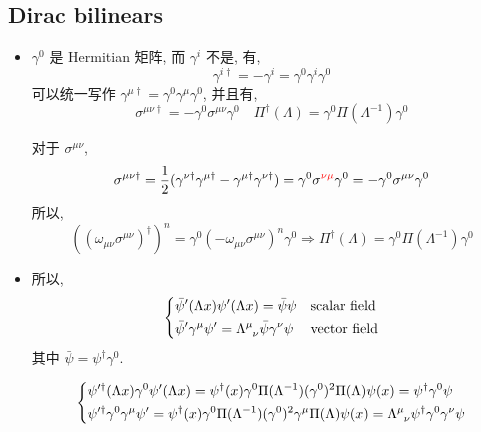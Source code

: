 \subsection{Dirac bilinears}
\begin{itemize}
	\item $\gamma^0$ 是 Hermitian 矩阵, 而 $\gamma^i$ 不是, 有,
	\begin{equation}
		\gamma^{i \dag} = - \gamma^i = \gamma^0 \gamma^i \gamma^0
	\end{equation}
	可以统一写作 $\gamma^{\mu \dag} = \gamma^0 \gamma^\mu \gamma^0$, 并且有,
	\begin{equation}
		\sigma^{\mu \nu \dag} = - \gamma^0 \sigma^{\mu \nu} \gamma^0 \quad \Pi^\dag(\Lambda) = \gamma^0 \Pi(\Lambda^{- 1}) \gamma^0
	\end{equation}
	
	\begin{tcolorbox}[title=calculation:]
		对于 $\sigma^{\mu \nu}$,
		\begin{equation}
			\sigma^{\mu \nu \dag} = \frac{1}{2} (\gamma^{\nu \dag} \gamma^{\mu \dag} - \gamma^{\mu \dag} \gamma^{\nu \dag}) = \gamma^0 \sigma^{\mathcolor{red}{\nu \mu}} \gamma^0 = - \gamma^0 \sigma^{\mu \nu} \gamma^0
		\end{equation}
		所以,
		\begin{equation}
			((\omega_{\mu \nu} \sigma^{\mu \nu})^\dag)^n = \gamma^0 (- \omega_{\mu \nu} \sigma^{\mu \nu})^n \gamma^0 \Longrightarrow \Pi^\dag(\Lambda) = \gamma^0 \Pi(\Lambda^{- 1}) \gamma^0
		\end{equation}
	\end{tcolorbox}
	
	\item 所以,
	\begin{equation}
		\begin{dcases}
			\bar{\psi}'(\Lambda x) \psi'(\Lambda x) = \bar{\psi} \psi & \text{scalar field} \\
			\bar{\psi}' \gamma^\mu \psi' = \tensor{\Lambda}{^\mu_\nu} \bar{\psi} \gamma^\nu \psi & \text{vector field}
		\end{dcases}
	\end{equation}
	其中 $\bar{\psi} = \psi^\dag \gamma^0$.
	
	\begin{tcolorbox}[title=calculation:]
		\begin{equation}
			\begin{dcases}
				\psi'^\dag(\Lambda x) \gamma^0 \psi'(\Lambda x) = \psi^\dag(x) \gamma^0 \Pi(\Lambda^{- 1}) (\gamma^0)^2 \Pi(\Lambda) \psi(x) = \psi^\dag \gamma^0 \psi \\
				\psi'^\dag \gamma^0 \gamma^\mu \psi' = \psi^\dag(x) \gamma^0 \Pi(\Lambda^{- 1}) (\gamma^0)^2 \gamma^\mu \Pi(\Lambda) \psi(x) = \tensor{\Lambda}{^\mu_\nu} \psi^\dag \gamma^0 \gamma^\nu \psi
			\end{dcases}
		\end{equation}
		

\end{tcolorbox}
\end{itemize}
